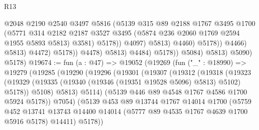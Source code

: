 \begin{lexlean}{R13}
\begin{coremodule}
                                            @2048
                                            @2190
                                            @2540
                                            @3497
                                            @5816
                                            (@5139
                                              @315
                                              @89
                                              @2188
                                              @1767
                                              @3495
                                              @1700
                                              (@5771
                                                @314
                                                @2182
                                                @2187
                                                @3527
                                                @3495
                                                (@5874 @236 @2060 @1769 @2594 @1955 @5893 @5813)
                                                @3581)
                                              @5178))
                                          @4097)
                                        @5813)
                                      @4460)
                                    @5178))
                                @4466)
                              @5813)
                            @4472)
                          @5178))
                      @4478)
                    @5813)
                  @4484)
                @5178))
            @5084)
          @5813)
        @5090)
      @5178)
@19674 := fun (a : @47) =>
  @19052
    (@19269
      (fun ("_" : @18990) =>
      @19279
        (@19285
          (@19290
            (@19296
              (@19301
                (@19307
                  (@19312
                    (@19318
                      (@19323
                        (@19329 (@19335 (@19340 (@19346 (@19351 @19528 @5096) @5813) @5102) @5178))
                        @5108)
                      @5813)
                    @5114)
                  (@5139 @446 @89 @4548 @1767 @4586 @1700 @5924 @5178))
                @7054)
              (@5139
                @453
                @89
                @13744
                @1767
                @14014
                @1700
                (@5759
                  @452
                  @13741
                  @13743
                  @14400
                  @14014
                  (@5777 @89 @4535 @1767 @4639 @1700 @5916 @5178)
                  @14411)
                @5178))

\end{coremodule}
\end{lexlean}
